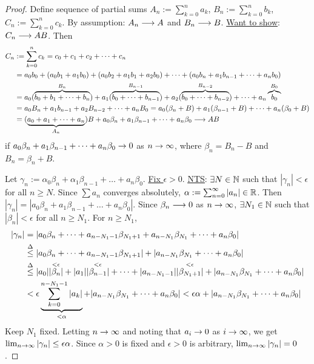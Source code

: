 \documentclass[]{article}
\begin{document}
\begin{proof}
	Define sequence of partial sums $A_n:= \sum_{k=0}^n a_k$, $B_n:=\sum_{k=0}^nb_k$, $C_n:=\sum_{k=0}^n c_k$.
	By assumption: $A_n\lra A$ and $B_n\lra B$.
	\ul{Want to show}: $C_n\lra AB$.
	Then 
	\begin{align*}
		C_n&:=\sum_{k=0}^nc_k = c_0+c_1+c_2+\dots+c_n \\
		   &= a_0b_0+(a_0b_1+a_1b_0) + (a_0b_2+a_1b_1+a_2b_0) + \dots + (a_0b_n + a_1b_{n-1}+\dots+a_nb_0) \\
		   &= a_0(\ob{B_n}{b_0 + b_1+\dots+b_n}) + a_1(\ob{B_{n-1}}{b_0+\dots+b_{n-1}}) + a_2(\ob{B_{n-2}}{b_0+\dots+b_{n-2}}) + \dots + a_n\ob{B_0}{b_0} \\
		   &= a_0B_n + a_1b_{n-1} + a_2B_{n-2} + \dots + a_nB_0 
		   = a_0(\beta_n+B) + a_1(\beta_{n-1}+B) + \dots + a_n(\beta_0 + B) \\
		   &= (\ub{A_n}{a_0+a_1+\dots+a_n})B + a_0\beta_n + a_1\beta_{n-1} + \dots + a_n\beta_0 \lra AB
	\end{align*}
	if $a_0\beta_n+a_1\beta_{n-1}+\dots+a_n\beta_0\ra 0$ as $n\ra\infty$, where $\beta_n = B_n-B$ and $B_n=\beta_n+B$.
	
	Let $\gamma_n:= \alpha_0\beta_n + \alpha_1\beta_{n-1} + \dots + a_n\beta_0$.
	\ul{Fix $\epsilon>0$}. \ul{\ul{NTS}}: $\exists N\in\mb N$ such that $|\gamma_n|<\epsilon$ for all $n\geq N$.
	Since $\sum a_n$ converges absolutely, $\alpha:= \sum_{n=0}^\infty |a_n|\in\mb R$.
	Then $|\gamma_n|=|a_0\beta_n + a_1\beta_{n-1} + \dots + a_n\beta_0|$.
	Since $\beta_n\lra 0$ as $n\ra\infty$, $\exists N_1\in\mb N$ such that $|\beta_n|<\epsilon$ for all $n\geq N_1$.
	For $n\geq N_1$,
	\begin{align*}
		|\gamma_n|&=|a_0\beta_n+\dots+a_{n-N_1-1}\beta_{N_1+1} + a_{n-N_1}\beta_{N_1} + \dots + a_n\beta_0| \\
				  &\os{\Delta}{\leq} |a_0\beta_n + \dots + a_{n-N_1-1}\beta_{N_1+1}| + |a_{n-N_1}\beta_{N_1} + \dots + a_n\beta_0| \\
				  &\os{\Delta}{\leq} |a_0|\os{<\epsilon}{|\beta_n|}+|a_1|\os{<\epsilon}{|\beta_{n-1}|}+\dots + |a_{n-N_1-1}|\os{<\epsilon}{|\beta_{N_1+1}|} + |a_{n-N_1}\beta_{N_1} + \dots + a_n\beta_0| \\
				  &< \epsilon \ub{<\alpha}{\sum_{k=0}^{n-N_1-1} |a_k|} + |a_{n-N_1}\beta_{N_1} + \dots + a_n\beta_0| 
				  < \epsilon\alpha + |a_{n-N_1}\beta_{N_1} + \dots + a_n\beta_0|
	\end{align*}
	Keep $N_1$ fixed.
	Letting $n\ra\infty$ and noting that $a_i\ra0$ as $i\ra\infty$, we get $\lim_{n\ra\infty} |\gamma_n|\leq\epsilon\alpha$.
	Since $\alpha>0$ is fixed and $\epsilon>0$ is arbitrary, $\lim_{n\ra\infty} |\gamma_n| = 0$.
\end{proof}
\end{document}

